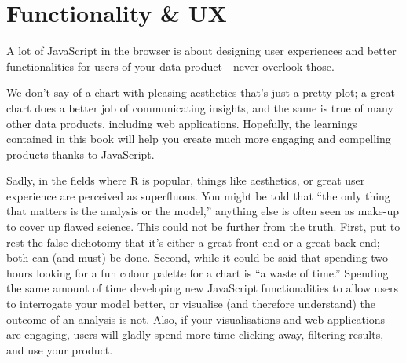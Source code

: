 \documentclass[10pt,]{krantz}
\begin{document}
\hypertarget{conclusion-ux}{%
\section{Functionality \& UX}\label{conclusion-ux}}

A lot of JavaScript in the browser is about designing user experiences and better functionalities for users of your data product---never overlook those.

We don't say of a chart with pleasing aesthetics that's just a pretty plot; a great chart does a better job of communicating insights, and the same is true of many other data products, including web applications. Hopefully, the learnings contained in this book will help you create much more engaging and compelling products thanks to JavaScript.

Sadly, in the fields where R is popular, things like aesthetics, or great user experience are perceived as superfluous. You might be told that ``the only thing that matters is the analysis or the model,'' anything else is often seen as make-up to cover up flawed science. This could not be further from the truth. First, put to rest the false dichotomy that it's either a great front-end or a great back-end; both can (and must) be done. Second, while it could be said that spending two hours looking for a fun colour palette for a chart is ``a waste of time.'' Spending the same amount of time developing new JavaScript functionalities to allow users to interrogate your model better, or visualise (and therefore understand) the outcome of an analysis is not. Also, if your visualisations and web applications are engaging, users will gladly spend more time clicking away, filtering results, and use your product.



\backmatter
\printindex
\end{document}
